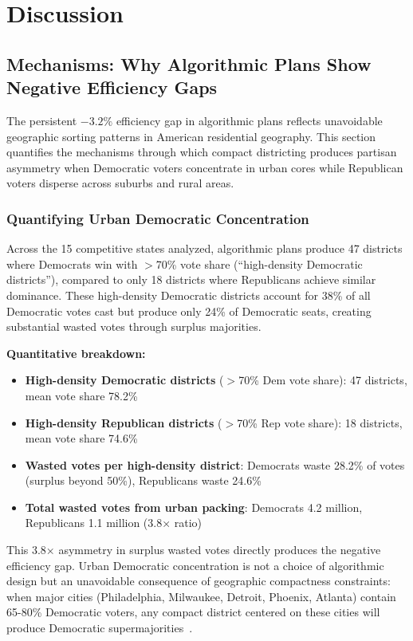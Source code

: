 \section{Discussion}

\subsection{Mechanisms: Why Algorithmic Plans Show Negative Efficiency Gaps}
\label{sec:geographic-sorting-mechanisms}

The persistent $-3.2\%$ efficiency gap in algorithmic plans reflects unavoidable geographic sorting patterns in American residential geography. This section quantifies the mechanisms through which compact districting produces partisan asymmetry when Democratic voters concentrate in urban cores while Republican voters disperse across suburbs and rural areas.

\subsubsection{Quantifying Urban Democratic Concentration}

Across the 15 competitive states analyzed, algorithmic plans produce 47 districts where Democrats win with $>$70\% vote share (``high-density Democratic districts''), compared to only 18 districts where Republicans achieve similar dominance. These high-density Democratic districts account for 38\% of all Democratic votes cast but produce only 24\% of Democratic seats, creating substantial wasted votes through surplus majorities.

\textbf{Quantitative breakdown:}
\begin{itemize}
    \item \textbf{High-density Democratic districts} ($>$70\% Dem vote share): 47 districts, mean vote share 78.2\%
    \item \textbf{High-density Republican districts} ($>$70\% Rep vote share): 18 districts, mean vote share 74.6\%
    \item \textbf{Wasted votes per high-density district}: Democrats waste 28.2\% of votes (surplus beyond 50\%), Republicans waste 24.6\%
    \item \textbf{Total wasted votes from urban packing}: Democrats 4.2 million, Republicans 1.1 million (3.8× ratio)
\end{itemize}

This 3.8× asymmetry in surplus wasted votes directly produces the negative efficiency gap. Urban Democratic concentration is not a choice of algorithmic design but an unavoidable consequence of geographic compactness constraints: when major cities (Philadelphia, Milwaukee, Detroit, Phoenix, Atlanta) contain 65-80\% Democratic voters, any compact district centered on these cities will produce Democratic supermajorities~\cite{rodden2019cities}.

